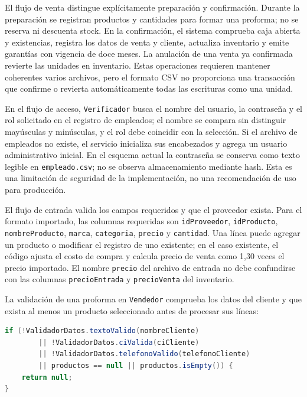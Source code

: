 El flujo de venta distingue explícitamente preparación y confirmación. Durante la preparación se registran productos y cantidades para formar una proforma; no se reserva ni descuenta stock. En la confirmación, el sistema comprueba caja abierta y existencias, registra los datos de venta y cliente, actualiza inventario y emite garantías con vigencia de doce meses. La anulación de una venta ya confirmada revierte las unidades en inventario. Estas operaciones requieren mantener coherentes varios archivos, pero el formato CSV no proporciona una transacción que confirme o revierta automáticamente todas las escrituras como una unidad.

En el flujo de acceso, \texttt{Verificador} busca el nombre del usuario, la contraseña y el rol solicitado en el registro de empleados; el nombre se compara sin distinguir mayúsculas y minúsculas, y el rol debe coincidir con la selección. Si el archivo de empleados no existe, el servicio inicializa sus encabezados y agrega un usuario administrativo inicial. En el esquema actual la contraseña se conserva como texto legible en \texttt{empleado.csv}; no se observa almacenamiento mediante hash. Esta es una limitación de seguridad de la implementación, no una recomendación de uso para producción.

El flujo de entrada valida los campos requeridos y que el proveedor exista. Para el formato importado, las columnas requeridas son \texttt{idProveedor}, \texttt{idProducto}, \texttt{nombreProducto}, \texttt{marca}, \texttt{categoria}, \texttt{precio} y \texttt{cantidad}. Una línea puede agregar un producto o modificar el registro de uno existente; en el caso existente, el código ajusta el costo de compra y calcula precio de venta como 1,30 veces el precio importado. El nombre \texttt{precio} del archivo de entrada no debe confundirse con las columnas \texttt{precioEntrada} y \texttt{precioVenta} del inventario.

La validación de una proforma en \texttt{Vendedor} comprueba los datos del cliente y que exista al menos un producto seleccionado antes de procesar sus líneas:

\begin{lstlisting}[language=Java,caption={Validaciones iniciales de la generación de una proforma.},label={lst:validacion-proforma}]
if (!ValidadorDatos.textoValido(nombreCliente)
        || !ValidadorDatos.ciValida(ciCliente)
        || !ValidadorDatos.telefonoValido(telefonoCliente)
        || productos == null || productos.isEmpty()) {
    return null;
}
\end{lstlisting}

